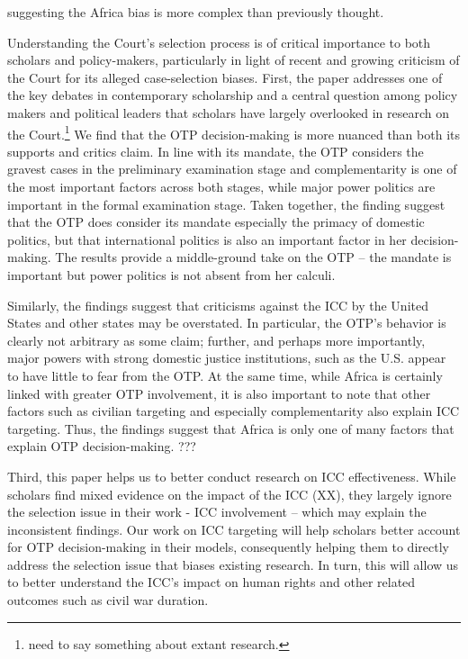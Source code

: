 suggesting the Africa bias is more complex than previously thought. %

Understanding the Court's selection process is of critical importance to both scholars and policy-makers, particularly in light of recent and growing criticism of the Court for its alleged case-selection biases. First, the paper addresses one of the key debates in contemporary scholarship and a central question among policy makers and political leaders that scholars have largely overlooked in research on the Court.\footnote{need to say something about extant research.} We find that the OTP decision-making is more nuanced than both its supports and critics claim. In line with its mandate, the OTP considers the gravest cases in the preliminary examination stage and complementarity is one of the most important factors across both stages, while major power politics are important in the formal examination stage. Taken together, the finding suggest that the OTP does consider its mandate especially the primacy of domestic politics, but that international politics is also an important factor in her decision-making. The results provide a middle-ground take on the OTP -- the mandate is important but power politics is not absent from her calculi.

Similarly, the findings suggest that criticisms against the ICC by the United States and other states may be overstated. In particular, the OTP's behavior is clearly not arbitrary as some claim; further, and perhaps more importantly, major powers with strong domestic justice institutions, such as the U.S. appear to have little to fear from the OTP. At the same time, while Africa is certainly linked with greater OTP involvement, it is also important to note that other factors such as civilian targeting and especially complementarity also explain ICC targeting. Thus, the findings suggest that Africa is only one of many factors that explain OTP decision-making. ???

Third, this paper helps us to better conduct research on ICC effectiveness. While scholars find mixed evidence on the impact of the ICC (XX), they largely ignore the selection issue in their work - ICC involvement -- which may explain the inconsistent findings. Our work on ICC targeting will help scholars better account for OTP decision-making in their models, consequently helping them to directly address the selection issue that biases existing research. In turn, this will allow us to better understand the ICC's impact on human rights and other related outcomes such as civil war duration.

